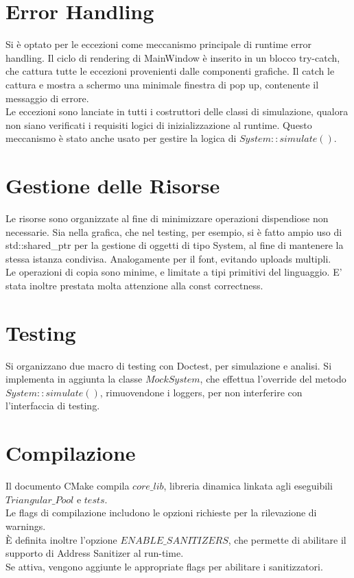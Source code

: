 \documentclass{article}
\begin{document}
\section{Error Handling}
Si è optato per le eccezioni come meccanismo principale di runtime error handling.
Il ciclo di rendering di MainWindow è inserito in un blocco try-catch, che cattura tutte le eccezioni provenienti dalle componenti grafiche. Il catch le cattura e mostra a schermo una minimale finestra di pop up, contenente il messaggio di errore.\\
Le eccezioni sono lanciate in tutti i costruttori delle classi di simulazione, qualora non siano verificati i requisiti logici di inizializzazione al runtime.
Questo meccanismo è stato anche usato per gestire la logica di $System::simulate()$.


\section{Gestione delle Risorse}
Le risorse sono organizzate al fine di minimizzare operazioni dispendiose non necessarie.
Sia nella grafica, che nel testing, per esempio, si è fatto ampio uso di std::shared\_ptr per la gestione di oggetti di tipo System, al fine di mantenere la stessa istanza condivisa.
Analogamente per il font, evitando uploads multipli.\\
Le operazioni di copia sono minime, e limitate a tipi primitivi del linguaggio.
E' stata inoltre prestata molta attenzione alla const correctness.


\section{Testing}
Si organizzano due macro di testing con Doctest, per simulazione e analisi.
Si implementa in aggiunta la classe $MockSystem$, che effettua l'override del metodo $System::simulate()$, rimuovendone i loggers, per non interferire con l'interfaccia di testing.

\section{Compilazione}
Il documento CMake compila $core\_lib$, libreria dinamica linkata agli eseguibili $Triangular\_Pool$ e $tests$.\\
Le flags di compilazione includono le opzioni richieste per la rilevazione di warnings.\\
È definita inoltre l'opzione $ENABLE\_SANITIZERS$, che permette di abilitare il supporto di Address Sanitizer al run-time.\\
Se attiva, vengono aggiunte le appropriate flags per abilitare i sanitizzatori.
\end{document}
